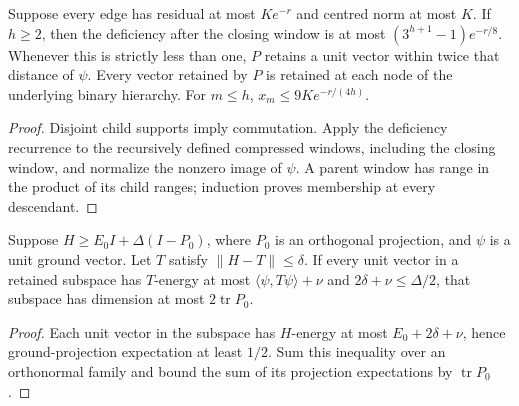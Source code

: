 \begin{lemma}
    \label{lem:hastings05_constructed_windows}
    \leanok
    Suppose every edge has residual at most $Ke^{-r}$ and centred norm
    at most $K$. If $h\ge2$, then the deficiency after the closing
    window is at most $(3^{h+1}-1)e^{-r/8}$. Whenever this is strictly
    less than one, $P$ retains a unit vector within twice that distance
    of $\psi$. Every vector retained by $P$ is retained at each node
    of the underlying binary hierarchy. For $m\le h$,
    $x_m\le9K e^{-r/(4h)}$.
\end{lemma}
\begin{proof}\leanok
    Disjoint child supports imply commutation. Apply the deficiency
    recurrence to the recursively defined compressed windows, including
    the closing window, and normalize the nonzero image of $\psi$.
    A parent window has range in the product of its child ranges;
    induction proves membership at every descendant.
\end{proof}

\begin{lemma}
    \label{lem:hastings05_physical_energy_comparison}
    \leanok
    Suppose $H\ge E_0I+\Delta(I-P_0)$, where $P_0$ is an orthogonal
    projection, and $\psi$ is a unit ground vector. Let $T$ satisfy
    $\|H-T\|\le\delta$. If every unit vector in a retained subspace
    has $T$-energy at most $\langle\psi,T\psi\rangle+\nu$ and
    $2\delta+\nu\le\Delta/2$, that subspace has dimension at most
    $2\operatorname{tr}P_0$.
\end{lemma}
\begin{proof}\leanok
    Each unit vector in the subspace has $H$-energy at most
    $E_0+2\delta+\nu$, hence ground-projection expectation at least
    $1/2$. Sum this inequality over an orthonormal family and bound
    the sum of its projection expectations by $\operatorname{tr}P_0$.
\end{proof}

